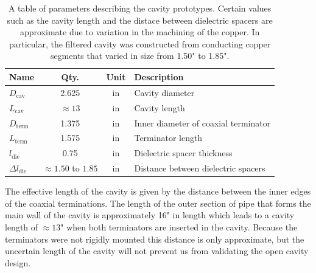 \begin{table}[htbp]
    \centering
    \caption{\label{tab:chap6-cavity-prototype-params} A table of parameters describing the cavity prototypes. Certain values such as the cavity length and the distace between dielectric spacers are approximate due to variation in the machining of the copper. In particular, the filtered cavity was constructed from conducting copper segments that varied in size from 1.50" to 1.85".}
    \begin{tabular}{l|c|c|l}
        \hline
        Name & Qty. & Unit & Description \\
        \hline
        $D_\mathrm{cav}$ & 2.625 & in & Cavity diameter\\
        $L_\mathrm{cav}$ & $\approx 13$ & in & Cavity length\\
        $D_\mathrm{term}$ & 1.375 & in & Inner diameter of coaxial terminator\\
        $L_\mathrm{term}$ & 1.575 & in & Terminator length\\
        \hline
        $l_\mathrm{die}$ & 0.75 & in & Dielectric spacer thickness\\
        $\Delta l_\mathrm{die}$ & $\approx 1.50$ to $1.85$ & in & Distance between dielectric spacers\\
        \hline
    \end{tabular}
\end{table}

The effective length of the cavity is given by the distance between the inner edges of the coaxial terminations. The length of the outer section of pipe that forms the main wall of the cavity is approximately 16" in length which leads to a cavity length of $\approx 13$" when both terminators are inserted in the cavity. Because the terminators were not rigidly mounted this distance is only approximate, but the uncertain length of the cavity will not prevent us from validating the open cavity design.

